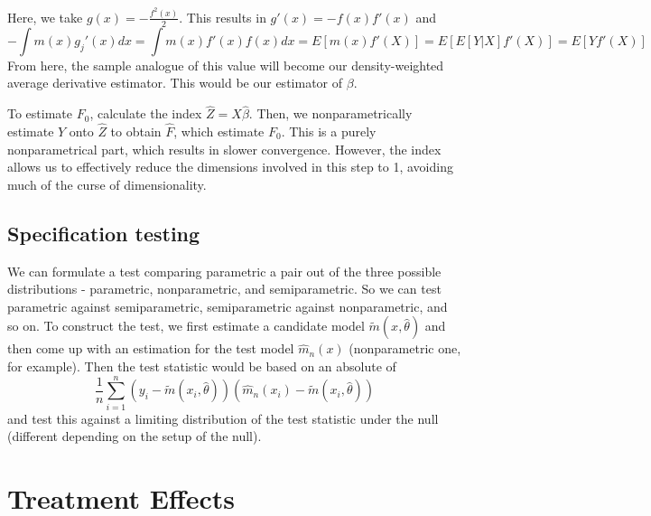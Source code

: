 \documentclass[12pt]{article}
\theoremstyle{definition}
\theoremstyle{property}
\theoremstyle{assumption}
\theoremstyle{example}
\theoremstyle{comment}
\begin{document}
Here, we take $g(x)= -\frac{f^2(x)}{2}$. This results in $g'(x) =- f(x)f'(x)$ and 
\[
- \int m(x)g_j'(x)dx = \int m(x)f'(x)f(x)dx = E[m(x)f'(X)]=E[E[Y|X]f'(X)]=E[Yf'(X)]
\]
From here, the sample analogue of this value will become our density-weighted average derivative estimator. This would be our estimator of $\beta$.
\par
To estimate $F_0$, calculate the index $\widehat{Z} = X\hat{\beta}$. Then, we nonparametrically estimate $Y$ onto $\widehat{Z}$ to obtain $\widehat{F}$, which estimate $F_0$. This is a purely nonparametrical part, which results in slower convergence. However, the index allows us to effectively reduce the dimensions involved in this step to 1, avoiding much of the curse of dimensionality. 

\subsection{Specification testing}
We can formulate a test comparing parametric a pair out of the three possible distributions - parametric, nonparametric, and semiparametric. So we can test parametric against semiparametric, semiparametric against nonparametric, and so on. To construct the test, we first estimate a candidate model $\tilde{m}(x,\hat{\theta})$ and then come up with an estimation for the test model $\hat{m}_n(x)$ (nonparametric one, for example). Then the test statistic would be based on an absolute of
\[
\frac{1}{n}\sum_{i=1}^n (y_i-\tilde{m}(x_i, \hat{\theta}))(\hat{m}_n(x_i)-\tilde{m}(x_i, \hat{\theta}))
\]
and test this against a limiting distribution of the test statistic under the null (different depending on the setup of the null). 
\section{Treatment Effects}
\end{document}
